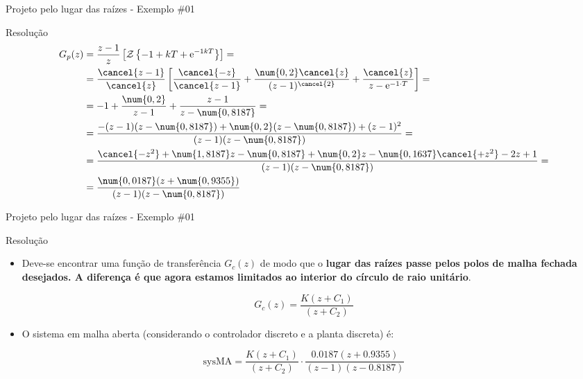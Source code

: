 \begin{frame}{Projeto pelo lugar das raízes - Exemplo \#01}
\begin{block}{Resolução}
	\begin{align*}
	G_p(z)&=\frac{z-1}{z}\left[ \mathcal{Z}\left\lbrace  -1+kT+\text{e}^{-1kT}\right\rbrace   \right]=\\
	&= \frac{\cancel{z-1}}{\cancel{z}}\left[ \frac{\cancel{-z}}{\cancel{z-1}}+\frac{\num{0,2}\cancel{z}}{(z-1)^{\cancel{2}}}+\frac{\cancel{z}}{z-\text{e}^{-1\cdot T}}\right]=\\
	&=-1+\frac{\num{0,2}}{z-1}+\frac{z-1}{z-\num{0,8187}}=\\
	&=\frac{-(z-1)(z-\num{0,8187})+\num{0,2}(z-\num{0,8187})+(z-1)^{2}}{(z-1)(z-\num{0,8187})}=\\
	&=\frac{\cancel{-z^{2}}+\num{1,8187}z-\num{0,8187}+\num{0,2}z-\num{0,1637}\cancel{+z^{2}}-2z+1}{(z-1)(z-\num{0,8187})}=\\
	&=\frac{\num{0,0187}(z+\num{0,9355})}{(z-1)(z-\num{0,8187})}
	\end{align*}
\end{block}
\end{frame}


\begin{frame}{Projeto pelo lugar das raízes - Exemplo \#01}
\begin{block}{Resolução}
\begin{itemize}
    \item Deve-se encontrar uma função de transferência $ G_c(z) $ de modo que o \textbf{lugar das raízes passe pelos polos de malha fechada desejados. A diferença é que agora estamos limitados ao interior do círculo de raio unitário}.
\end{itemize}
	
	\[ G_c(z)=\dfrac{K(z+C_1)}{(z+C_2)} \]
	
\begin{itemize}
    \item O sistema em malha aberta (considerando o controlador discreto e a planta discreta) é:
\end{itemize}

	\[ \text{sysMA}=\frac{K(z+C_1)}{(z+C_2)}\cdot\frac{\num{0,0187}(z+\num{0,9355})}{(z-1)(z-\num{0,8187})} \]
\end{block}
\end{frame}

